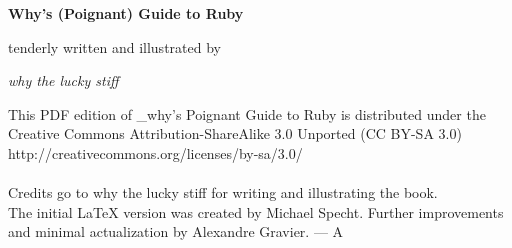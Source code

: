 \documentclass[10pt,twoside]{report}
\renewcommand{\headrulewidth}{0.25pt}
\renewcommand{\headrulewidth}{0pt}
\begin{document}
\pagestyle{empty}
\begin{titlepage}
\begin{center}
\vspace*{2cm}
\normalfont\noindent\bf\Huge{Why's (Poignant) Guide to Ruby}

\vfill

\normalfont\noindent\large{tenderly written and illustrated by}

\vspace*{-0.2cm}

\normalfont\noindent\large{\em why the lucky stiff}
\end{center}
\end{titlepage}
\newpage
\thispagestyle{empty}
\mbox{}

\newpage
\pagestyle{empty}
\begin{center}
\vspace*{4cm}
This PDF edition of \_why's Poignant Guide to Ruby is distributed
under the Creative Commons Attribution-ShareAlike 3.0 Unported 
(CC BY-SA 3.0)
\vfill
http://creativecommons.org/licenses/by-sa/3.0/\\\\
Credits go to why the lucky stiff for writing and illustrating the
book.\\
The initial LaTeX version was created by Michael Specht. Further
improvements and minimal actualization by Alexandre Gravier.
\hspace{8.5cm}--- A
\vspace{5cm}
\end{center}
\newpage
\thispagestyle{empty}
\mbox{}

\cleartoevenpage
\setcounter{page}{2}
\setcounter{tocdepth}{1}
\setcounter{secnumdepth}{2}
\begin{spacing}{1.135}
\tableofcontents
\end{spacing}

\newpage

\thispagestyle{empty}

\pagestyle{fancy}

 {
  \renewcommand{\headrulewidth}{0.25pt}
  \fancyhf{}
  \fancyhead[EL,OR]{\thepage}
}
\cleartooddpage
\end{document}
